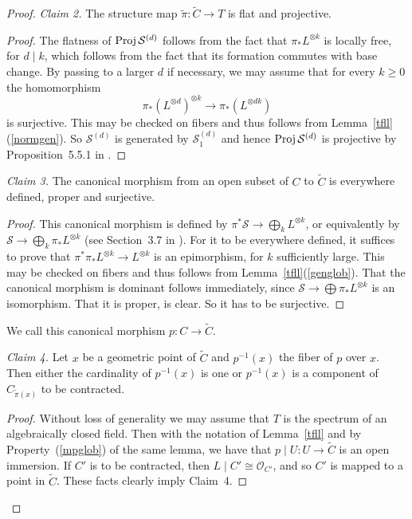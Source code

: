 \documentclass[11pt]{amsart}
\theoremstyle{definition}
\theoremstyle{remark}
\newenvironment{pf}{\begin{proof}}{\end{proof}}
\renewcommand{\tilde}{\widetilde}
\newcommand{\upst}{^{\ast}}
\newcommand{\lst}{_{\ast}}
\renewcommand{\O}{{\mathcal{O}}}
\newcommand{\sS}{{\mathcal{S}}}
\newcommand{\resto}{{ \mid }}
\newcommand{\proj}{\operatorname{\rm Proj}\nolimits}
\theoremstyle{plain}
\theoremstyle{definition}
\theoremstyle{remark}
\begin{document}
\begin{pf}
{\em Claim 2. }The structure map \(\tilde{\pi}:\tilde{C}\rightarrow T\) is flat
and projective.
\begin{pf}
The flatness of \(\proj\sS^{(d)}\) follows from the fact that \(\pi\lst L^{\otimes
k}\) is locally free, for \(d\mid k\),
which follows from the fact that its formation commutes with base change. By
passing to a larger \(d\) if necessary, we
may assume that for every \(k\geq0\) the homomorphism
\[
\pi\lst(L^{\otimes d})^{\otimes k}\longrightarrow\pi\lst(L^{\otimes dk})
\]
is surjective. This may be checked on fibers and thus follows from
Lemma~\ref{tfll}(\ref{normgen}). So \(\sS^{(d)}\) is
generated by \(\sS^{(d)}_1\) and hence \(\proj\sS^{(d)}\) is projective by
Proposition~5.5.1 in \cite{ega2}.
\end{pf}

{\em Claim 3. }The canonical morphism from an open subset of \(C\) to \(\tilde{C}\)
is everywhere defined, proper and
surjective.
\begin{pf}
This canonical morphism is defined by \(\pi\upst\sS\rightarrow\bigoplus_k
L^{\otimes k}\), or equivalently by
\(\sS\rightarrow\bigoplus_k\pi\lst L^{\otimes k}\) (see Section~3.7 in
\cite{ega2}). For it to be everywhere defined, it
suffices to prove that \(\pi\upst\pi\lst L^{\otimes k}\rightarrow L^{\otimes k}\)
is an epimorphism, for \(k\) sufficiently
large. This may be checked on fibers and thus follows from
Lemma~\ref{tfll}(\ref{genglob}). That the canonical morphism
is dominant follows immediately, since \(\sS\rightarrow\bigoplus\pi\lst
L^{\otimes k}\) is an isomorphism. That it is
proper, is clear. So it has to be surjective.
\end{pf}

We call this canonical morphism \(p:C\rightarrow\tilde{C}\).

{\em Claim 4. }Let \(x\) be a geometric point of \(\tilde{C}\) and \(p^{-1}(x)\) the
fiber of \(p\) over \(x\). Then either the
cardinality of \(p^{-1}(x)\) is one or \(p^{-1}(x)\) is a component of
\(C_{\tilde{\pi}(x)}\) to be contracted.
\begin{pf}
Without loss of generality we may assume that \(T\) is the spectrum of an
algebraically closed field. Then with the
notation of Lemma~\ref{tfll} and by Property~(\ref{mpglob}) of the same lemma,
we have that \(p\resto
U:U\rightarrow\tilde{C}\) is an open immersion. If \(C'\) is to be contracted,
then \(L\resto C'\cong\O_{C'}\), and so \(C'\)
is mapped to a point in \(\tilde{C}\). These facts clearly imply Claim~4.
\end{pf}


\end{pf}
\end{document}
